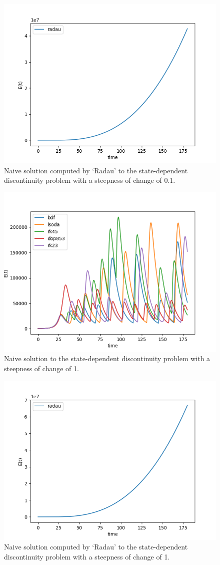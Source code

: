 \begin{figure}[H]
\centering
\includegraphics[width=0.7\linewidth]{./figures/exp_state_naive_radau_0_1}
\caption{Naive solution computed by `Radau' to the state-dependent discontinuity problem with a steepness of change of 0.1.}
\label{fig:exp_state_naive_radau_0_1}
\end{figure}

\begin{figure}[H]
\centering
\includegraphics[width=0.7\linewidth]{./figures/exp_state_naive_1}
\caption{Naive solution to the state-dependent discontinuity problem with a steepness of change of 1.}
\label{fig:exp_state_naive_1}
\end{figure}

\begin{figure}[H]
\centering
\includegraphics[width=0.7\linewidth]{./figures/exp_state_naive_radau_1}
\caption{Naive solution computed by `Radau' to the state-dependent discontinuity problem with a steepness of change of 1.}
\label{fig:exp_state_naive_radau_1}
\end{figure}


